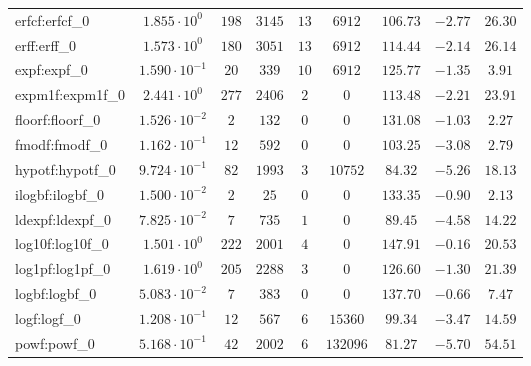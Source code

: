 \begin{tabular}{|l|c|c|c|c|c|c|c|c|}
erfcf:erfcf\_0               & $ 1.855 \cdot 10^{0}  $ & $ 198    $ & $ 3145  $ & $ 13  $ & $ 6912   $ & $ 106.73      $ & $ -2.77   $ & $ 26.30   $ \\
erff:erff\_0                 & $ 1.573 \cdot 10^{0}  $ & $ 180    $ & $ 3051  $ & $ 13  $ & $ 6912   $ & $ 114.44      $ & $ -2.14   $ & $ 26.14   $ \\
expf:expf\_0                 & $ 1.590 \cdot 10^{-1} $ & $ 20     $ & $ 339   $ & $ 10  $ & $ 6912   $ & $ 125.77      $ & $ -1.35   $ & $ 3.91    $ \\
expm1f:expm1f\_0             & $ 2.441 \cdot 10^{0}  $ & $ 277    $ & $ 2406  $ & $ 2   $ & $ 0      $ & $ 113.48      $ & $ -2.21   $ & $ 23.91   $ \\
floorf:floorf\_0             & $ 1.526 \cdot 10^{-2} $ & $ 2      $ & $ 132   $ & $ 0   $ & $ 0      $ & $ 131.08      $ & $ -1.03   $ & $ 2.27    $ \\
fmodf:fmodf\_0               & $ 1.162 \cdot 10^{-1} $ & $ 12     $ & $ 592   $ & $ 0   $ & $ 0      $ & $ 103.25      $ & $ -3.08   $ & $ 2.79    $ \\
hypotf:hypotf\_0             & $ 9.724 \cdot 10^{-1} $ & $ 82     $ & $ 1993  $ & $ 3   $ & $ 10752  $ & $ 84.32       $ & $ -5.26   $ & $ 18.13   $ \\
ilogbf:ilogbf\_0             & $ 1.500 \cdot 10^{-2} $ & $ 2      $ & $ 25    $ & $ 0   $ & $ 0      $ & $ 133.35      $ & $ -0.90   $ & $ 2.13    $ \\
ldexpf:ldexpf\_0             & $ 7.825 \cdot 10^{-2} $ & $ 7      $ & $ 735   $ & $ 1   $ & $ 0      $ & $ 89.45       $ & $ -4.58   $ & $ 14.22   $ \\
log10f:log10f\_0             & $ 1.501 \cdot 10^{0}  $ & $ 222    $ & $ 2001  $ & $ 4   $ & $ 0      $ & $ 147.91      $ & $ -0.16   $ & $ 20.53   $ \\
log1pf:log1pf\_0             & $ 1.619 \cdot 10^{0}  $ & $ 205    $ & $ 2288  $ & $ 3   $ & $ 0      $ & $ 126.60      $ & $ -1.30   $ & $ 21.39   $ \\
logbf:logbf\_0               & $ 5.083 \cdot 10^{-2} $ & $ 7      $ & $ 383   $ & $ 0   $ & $ 0      $ & $ 137.70      $ & $ -0.66   $ & $ 7.47    $ \\
logf:logf\_0                 & $ 1.208 \cdot 10^{-1} $ & $ 12     $ & $ 567   $ & $ 6   $ & $ 15360  $ & $ 99.34       $ & $ -3.47   $ & $ 14.59   $ \\
powf:powf\_0                 & $ 5.168 \cdot 10^{-1} $ & $ 42     $ & $ 2002  $ & $ 6   $ & $ 132096 $ & $ 81.27       $ & $ -5.70   $ & $ 54.51   $ \\

\end{tabular}
